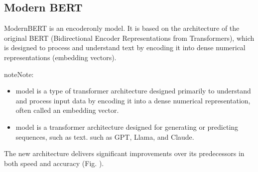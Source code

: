 \documentclass[letterpaper,11pt,english]{sphinxmanual}
\begin{document}
\begin{itemize}
\begin{itemize}
\end{itemize}

\end{itemize}


\subsection{Modern BERT}
\label{\detokenize{prelim:modern-bert}}
\sphinxAtStartPar
ModernBERT is an encoder\sphinxhyphen{}only model. It is based on the architecture of the original
BERT (Bidirectional Encoder Representations from Transformers), which is designed
to process and understand text by encoding it into dense numerical representations (embedding vectors).

\begin{sphinxadmonition}{note}{Note:}\begin{itemize}
\item {} 
\sphinxAtStartPar
{} model is a type of transformer architecture designed primarily
to understand and process input data by encoding it into a dense numerical representation,
often called an embedding vector.

\item {} 
\sphinxAtStartPar
{} model is a transformer architecture designed for generating or predicting sequences,
such as text. such as GPT, Llama, and Claude.

\end{itemize}
\end{sphinxadmonition}

\sphinxAtStartPar
The new architecture delivers significant improvements over its predecessors in both
speed and accuracy (Fig. {\hyperref[\detokenize{prelim:fig-mbert-curve}]{}}).
\end{document}
